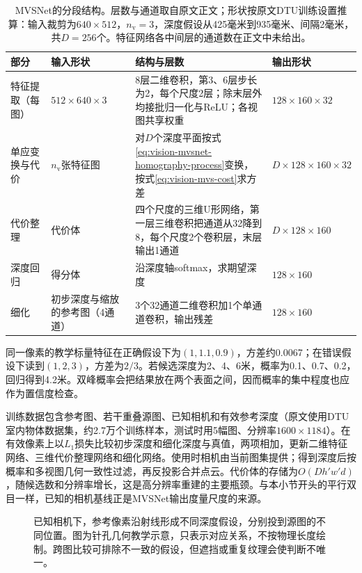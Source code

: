 \begin{table}[tbp]
 \centering
 \small
 \begin{tabularx}{\linewidth}{@{}llXl@{}}
 \toprule
 部分 & 输入形状 & 结构与层数 & 输出形状\\
 \midrule
 特征提取（每图） & $512\times640\times3$ & 8层二维卷积，第3、6层步长为2，每个尺度2层；除末层外均接批归一化与ReLU；各视图共享权重 & $128\times160\times32$\\
 单应变换与代价 & $n_{\mathrm v}$张特征图 & 对$D$个深度平面按式\eqref{eq:vision-mvsnet-homography-process}变换，按式\eqref{eq:vision-mvs-cost}求方差 & $D\times128\times160\times32$\\
 代价整理 & 代价体 & 四个尺度的三维U形网络，第一层三维卷积把通道从32降到8，每个尺度2个卷积层，末层输出1通道 & $D\times128\times160$\\
 深度回归 & 得分体 & 沿深度轴softmax，求期望深度 & $128\times160$\\
 细化 & 初步深度与缩放的参考图（4通道） & 3个32通道二维卷积加1个单通道卷积，输出残差 & $128\times160$\\
 \bottomrule
 \end{tabularx}
 \caption{MVSNet的分段结构。层数与通道取自原文正文；形状按原文DTU训练设置推算：输入裁剪为$640\times512$，$n_{\mathrm v}=3$，深度假设从425毫米到935毫米、间隔2毫米，共$D=256$个。特征网络各中间层的通道数在正文中未给出。}
 \label{tab:vision-recognition-mvsnet-structure}
\end{table}

同一像素的教学标量特征在正确假设下为$(1,1.1,0.9)$，方差约0.0067；在错误假设下读到$(1,2,3)$，方差为$2/3$。若候选深度为2、4、6米，概率为0.1、0.7、0.2，回归得到4.2米。双峰概率会把结果放在两个表面之间，因而概率的集中程度也应作为置信度检查。

训练数据包含参考图、若干重叠源图、已知相机和有效参考深度（原文使用DTU室内物体数据集，约2.7万个训练样本，测试时用5幅图、分辨率$1600\times1184$）。在有效像素上以$L_1$损失比较初步深度和细化深度与真值，两项相加，更新二维特征网络、三维代价整理网络和细化网络。使用时相机由当前图集提供；得到深度后按概率和多视图几何一致性过滤，再反投影合并点云。代价体的存储为$O(Dh'w'd)$，随候选数和分辨率增长，这是高分辨率重建的主要瓶颈。与本小节开头的平行双目一样，已知的相机基线正是MVSNet输出度量尺度的来源。

\begin{figure}[htbp]
 \centering
 
 \caption{已知相机下，参考像素沿射线形成不同深度假设，分别投到源图的不同位置。图为针孔几何教学示意，只表示对应关系，不按物理长度绘制。跨图比较可排除不一致的假设，但遮挡或重复纹理会使判断不唯一。}
 \label{fig:vision-depth-hypotheses}
\end{figure}

